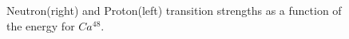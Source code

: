 \documentclass[a4paper]{paper}
\begin{document}
                \begin{figure}[h]
                    \centering
                       
                        \qquad
                        \caption{Neutron(right) and Proton(left) transition strengths as a function of the energy for $Ca^{48}$.}
                        \label{fig:rpapn}
                \end{figure}
                
\end{document}
